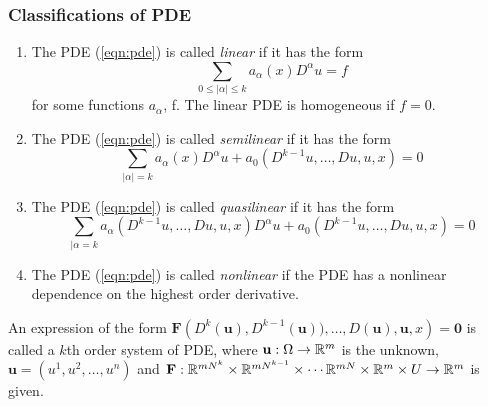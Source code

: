 \subsubsection{Classifications of PDE}
\begin{enumerate}[label=(\roman*)]
    \item The PDE (\ref{eqn:pde}) is called \textit{linear} if it has the form $$\sum_{0\le |\alpha| \le k} a_{\alpha} (x) D^{\alpha} u =f$$ 
	for some functions $a_{ \alpha }$, f. The linear PDE is homogeneous if $f=0$.
\item The PDE (\ref{eqn:pde}) is called \textit{semilinear} if it has the form
    $$\sum_{|\alpha|=k} a_{\alpha}(x) D^{\alpha}u + a_0 \left( D^{k-1}u, \ldots , Du, u, x \right) =0$$
\item The PDE (\ref{eqn:pde}) is called \textit{quasilinear} if it has the form 
    $$\sum_{|\alpha =k} a_{\alpha} (D^{k-1} u, \ldots , Du, u, x) D^{\alpha} u + a_0 \left( D^{k-1} u, \ldots , Du, u, x \right) = 0$$
\item The PDE (\ref{eqn:pde}) is called \textit{nonlinear} if the PDE has a nonlinear dependence on the highest order derivative.

\end{enumerate}

\begin{definition}
An expression of the form $\mathbf{F} \left( D^k (\mathbf{u}), D^{k-1} (\mathbf {u})), \ldots , D (\mathbf{u}), \mathbf{u} , x \right)=\mathbf{0}$ is called a $k$th order system of PDE, where $\mathbf{u} : \Omega \to \mathbb R ^m$ is the unknown, $\mathbf{u}= \left( u^1 , u^2 , \ldots, u^n \right)$ and $\mathbf{F} : \mathbb R ^{mN^k} \times \mathbb R ^{mN^{k-1}} \times \cdots \mathbb R ^{mN} \times \mathbb R ^m \times U \to \mathbb R ^m$ is given.
    \label{def:system-of-pde}
\end{definition}

